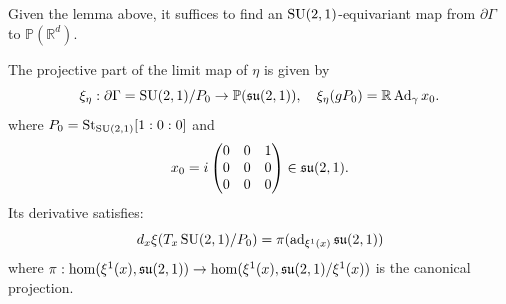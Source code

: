 \documentclass{report}
\begin{document}
Given the lemma above, it suffices to find an $\operatorname{{\mathrm{SU}}}(2,1)$-equivariant map from $\partial \Gamma$ to $\mathbb P(\mathbb R^d)$.
\begin{proposition}\label{prop:counterexample_limit_map}
    The projective part of the limit map of $\eta$ is given by
    \[
        \xi_\eta: \partial \Gamma = \operatorname{{\mathrm{SU}}}(2,1)/P_0 \to \mathbb P(\mathfrak{su}(2,1)), \quad \xi_\eta(g P_0) = \mathbb R \operatorname{Ad}_{\gamma} x_0.
    \]
    where  $P_0 = \mathrm{St}_{\operatorname{{\mathrm{SU}}}(2,1)} [1:0:0]$ and 
    \[
    x_0 = i \begin{pmatrix} 0 & 0 & 1 \\ 0 & 0 & 0 \\ 0 & 0 & 0 \end{pmatrix} \in \operatorname{{\mathfrak{su}}}(2,1).
    \]
    Its derivative satisfies: 
    \[
    d_x \xi(T_x \operatorname{{\mathrm{SU}}}(2,1)/P_0) = \pi(\operatorname{ad}_{\xi^1(x)} \operatorname{{\mathfrak{su}}}(2,1))
    \]
    where $\pi : \hom (\xi^1(x), \operatorname{{\mathfrak{su}}}(2,1)) \to \hom(\xi^1(x), \operatorname{{\mathfrak{su}}}(2,1)/ \xi^1(x))$ is the canonical projection.
\end{proposition}
\end{document}
